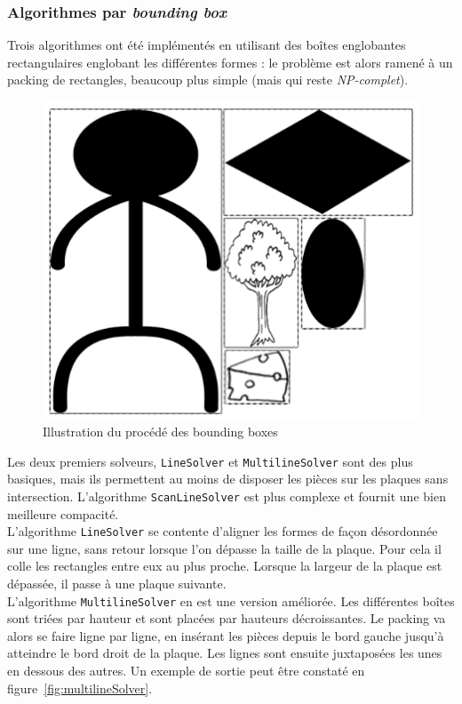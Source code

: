 \subsubsection{Algorithmes par \textit{bounding box}}

Trois algorithmes ont été implémentés en utilisant des boîtes englobantes rectangulaires englobant les différentes formes : le problème est alors ramené à un packing de rectangles, beaucoup plus simple (mais qui reste \textit{NP-complet}).\\

\begin{figure}[!htb]
\centering
\includegraphics[scale=0.7]{img/boundingBox.png}
\caption{Illustration du procédé des bounding boxes}
\label{fig:boundingBox}
\end{figure}

\indent Les deux premiers solveurs, \texttt{LineSolver} et \texttt{MultilineSolver} sont des plus basiques, mais ils permettent au moins de disposer les pièces sur les plaques sans intersection. L'algorithme \texttt{ScanLineSolver} est plus complexe et fournit une bien meilleure compacité.\\

L'algorithme \texttt{LineSolver} se contente d'aligner les formes de façon désordonnée sur une ligne, sans retour lorsque l'on dépasse la taille de la plaque. Pour cela il colle les rectangles entre eux au plus proche. Lorsque la largeur de la plaque est dépassée, il passe à une plaque suivante.\\

L'algorithme \texttt{MultilineSolver} en est une version améliorée. Les différentes boîtes sont triées par hauteur et sont placées par hauteurs décroissantes.
Le packing va alors se faire ligne par ligne, en insérant les pièces depuis le bord gauche jusqu'à atteindre le bord droit de la plaque. Les lignes sont ensuite juxtaposées les unes en dessous des autres. Un exemple de sortie peut être constaté en figure~\ref{fig:multilineSolver}.

